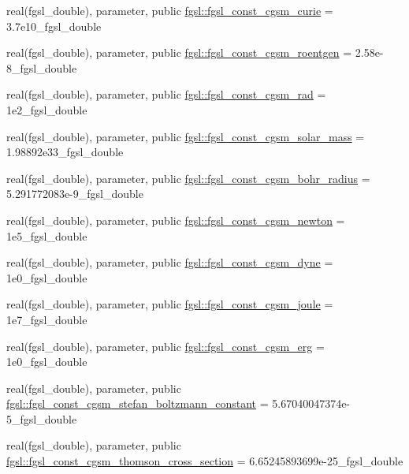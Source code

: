 \begin{DoxyCompactItemize}
\item 
real(fgsl\+\_\+double), parameter, public \hyperlink{namespacefgsl_a1a2ad0a32e7001630dc57fb05a13896b}{fgsl\+::fgsl\+\_\+const\+\_\+cgsm\+\_\+curie} = 3.\+7e10\+\_\+fgsl\+\_\+double
\item 
real(fgsl\+\_\+double), parameter, public \hyperlink{namespacefgsl_a081808c3b3b7297c71e015034c089d04}{fgsl\+::fgsl\+\_\+const\+\_\+cgsm\+\_\+roentgen} = 2.\+58e-\/8\+\_\+fgsl\+\_\+double
\item 
real(fgsl\+\_\+double), parameter, public \hyperlink{namespacefgsl_aa616f1f47c1a107f10dcb7418517b723}{fgsl\+::fgsl\+\_\+const\+\_\+cgsm\+\_\+rad} = 1e2\+\_\+fgsl\+\_\+double
\item 
real(fgsl\+\_\+double), parameter, public \hyperlink{namespacefgsl_a41afd20c5be47db2d713c42cac018572}{fgsl\+::fgsl\+\_\+const\+\_\+cgsm\+\_\+solar\+\_\+mass} = 1.\+98892e33\+\_\+fgsl\+\_\+double
\item 
real(fgsl\+\_\+double), parameter, public \hyperlink{namespacefgsl_a61da4815b82a64d0b0a2a5737ee854f5}{fgsl\+::fgsl\+\_\+const\+\_\+cgsm\+\_\+bohr\+\_\+radius} = 5.\+291772083e-\/9\+\_\+fgsl\+\_\+double
\item 
real(fgsl\+\_\+double), parameter, public \hyperlink{namespacefgsl_a1130bb96c29d828c350ca8882cac2a6d}{fgsl\+::fgsl\+\_\+const\+\_\+cgsm\+\_\+newton} = 1e5\+\_\+fgsl\+\_\+double
\item 
real(fgsl\+\_\+double), parameter, public \hyperlink{namespacefgsl_a9d4d18eee80940b4fda61ccf8eb7a0a1}{fgsl\+::fgsl\+\_\+const\+\_\+cgsm\+\_\+dyne} = 1e0\+\_\+fgsl\+\_\+double
\item 
real(fgsl\+\_\+double), parameter, public \hyperlink{namespacefgsl_adea52d494e1c4e17f003736bd07eb592}{fgsl\+::fgsl\+\_\+const\+\_\+cgsm\+\_\+joule} = 1e7\+\_\+fgsl\+\_\+double
\item 
real(fgsl\+\_\+double), parameter, public \hyperlink{namespacefgsl_aa30f1017800c569944ad894fff2ae006}{fgsl\+::fgsl\+\_\+const\+\_\+cgsm\+\_\+erg} = 1e0\+\_\+fgsl\+\_\+double
\item 
real(fgsl\+\_\+double), parameter, public \hyperlink{namespacefgsl_a7b2b26a4a33ccd17f26be17db533b3ac}{fgsl\+::fgsl\+\_\+const\+\_\+cgsm\+\_\+stefan\+\_\+boltzmann\+\_\+constant} = 5.\+67040047374e-\/5\+\_\+fgsl\+\_\+double
\item 
real(fgsl\+\_\+double), parameter, public \hyperlink{namespacefgsl_a1581b093a3a9c09cff62c4bee45c1dcd}{fgsl\+::fgsl\+\_\+const\+\_\+cgsm\+\_\+thomson\+\_\+cross\+\_\+section} = 6.\+65245893699e-\/25\+\_\+fgsl\+\_\+double

\end{DoxyCompactItemize}
